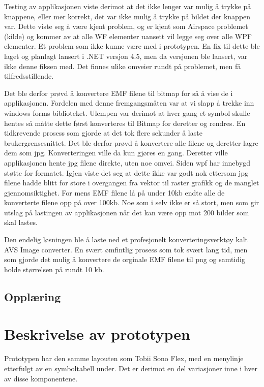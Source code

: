 Testing av applikasjonen viste derimot at det ikke lenger var mulig å trykke på knappene, eller mer korrekt, det var ikke mulig å trykke på  bildet der knappen var. Dette viste seg å være kjent problem, og er kjent som Airspace problemet (kilde) og kommer av at alle WF elementer uansett vil legge seg over alle WPF elementer. Et problem som ikke kunne være med i prototypen. En fix til dette ble laget og planlagt lansert i .NET versjon 4.5, men da versjonen ble lansert, var ikke denne fiksen med. Det finnes ulike omveier rundt på problemet, men få tilfredsstillende.  
 
Det ble derfor prøvd å konvertere EMF filene til bitmap for så å vise de i applikasjonen. Fordelen med denne fremgangsmåten var at vi slapp å trekke inn windows forms biblioteket. Ulempen var derimot at hver gang et symbol skulle hentes så måtte dette først konverteres til Bitmap for deretter og rendres. En tidkrevende prosess som gjorde at det tok flere sekunder å laste brukergrensesnittet. Det ble derfor prøvd å konvertere alle filene og deretter lagre dem som jpg. Konverteringen ville da kun gjøres en gang. Deretter ville applikasjonen hente jpg filene direkte, uten noe omvei. Siden wpf har innebygd støtte for formatet. Igjen viste det seg at dette ikke var godt nok ettersom jpg filene hadde blitt for store i overgangen fra vektor til raster grafikk og de manglet gjennomsiktighet. For mens EMF filene lå på under 10kb endte alle de konverterte filene opp på over 100kb. Noe som i selv ikke er så stort, men som gir utslag på lastingen av applikasjonen når det kan være opp mot 200 bilder som skal lastes. 
 
 
Den endelig løsningen ble å laste ned et profesjonelt konverteringsverktøy kalt AVS Image converter. En svært ømfintlig prosess som tok svært lang tid, men som gjorde det mulig å konvertere de orginale EMF filene til png og samtidig holde størrelsen på rundt 10 kb. 


\subsection{Opplæring}


 
\section{Beskrivelse av prototypen} 

Prototypen har den samme layouten som Tobii Sono Flex, med en menylinje etterfulgt av en symboltabell under. Det er derimot en del variasjoner inne i hver av disse komponentene. 
 
